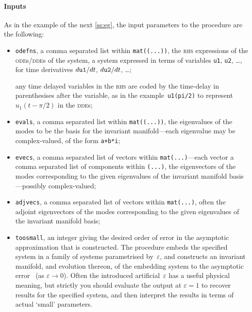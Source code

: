 \documentclass[11pt,a5paper]{article}
\def\eps{\varepsilon}
\begin{document}
\paragraph{Inputs}
As in the example of the next \cref{ss:eg}, the input
parameters to the procedure are the following:
\begin{itemize}

\item \verb|odefns|, a comma separated list within
\verb|mat((...))|, the \textsc{rhs} expressions of the
\textsc{ode}s/\textsc{dde}s of the system, a system
expressed in terms of variables \verb|u1|, \verb|u2|,
\ldots, for time derivatives \(\de t{\tt u1}\), \(\de t{\tt
u2}\), \ldots;

any time delayed variables in the \textsc{rhs} are coded by
the time-delay in parenthesises after the variable, as in
the example~\verb|u1(pi/2)| to represent~\(u_1(t-\pi/2)\) in
the \textsc{dde}s;

\item \verb|evals|, a comma separated list within
\verb|mat((...))|, the eigenvalues of the modes to be the
basis for the invariant manifold---each eigenvalue may be
complex-valued, of the form \verb|a+b*i|;

\item \verb|evecs|, a comma separated list of vectors within
\verb|mat(...)|---each vector a comma separated list of
components within \verb|(...)|, the eigenvectors of the
modes corresponding to the given eigenvalues of the
invariant manifold basis---possibly complex-valued;

\item \verb|adjvecs|, a comma separated list of vectors
within \verb|mat(...)|, often the adjoint eigenvectors of
the modes corresponding to the given eigenvalues of the
invariant manifold basis;  

\item \verb|toosmall|, an integer giving the desired order
of error in the asymptotic approximation that is
constructed.  The procedure embeds the specified system in a
family of systems parametrised by~\(\eps\), and constructs
an invariant manifold, and evolution thereon, of the
embedding system to the asymptotic error~\Ord{\eps^{\tt
toosmall}} (as \(\eps\to0\)). Often the introduced
artificial~\(\eps\) has a useful physical meaning, but
strictly you should evaluate the output at \(\eps=1\) to
recover results for the specified system, and then interpret
the results in terms of actual `small' parameters.

\end{itemize}
\end{document}
